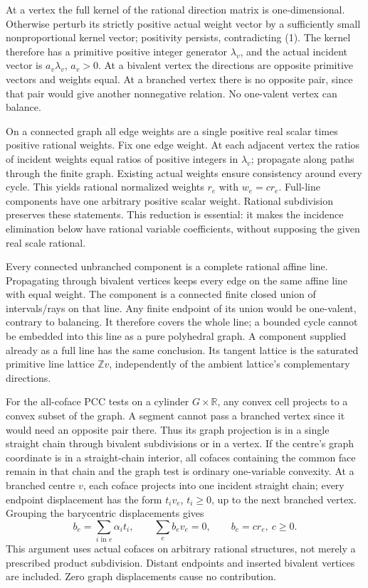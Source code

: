 \documentclass[
  11pt,
]{article}
\begin{document}
At a vertex the full kernel of the rational direction matrix is
one-dimensional. Otherwise perturb its strictly positive actual weight
vector by a sufficiently small nonproportional kernel vector; positivity
persists, contradicting (1). The kernel therefore has a primitive
positive integer generator \(\lambda_v\), and the actual incident vector
is \(a_v\lambda_v\), \(a_v>0\). At a bivalent vertex the directions are
opposite primitive vectors and weights equal. At a branched vertex there
is no opposite pair, since that pair would give another nonnegative
relation. No one-valent vertex can balance.

On a connected graph all edge weights are a single positive real scalar
times positive rational weights. Fix one edge weight. At each adjacent
vertex the ratios of incident weights equal ratios of positive integers
in \(\lambda_v\); propagate along paths through the finite graph.
Existing actual weights ensure consistency around every cycle. This
yields rational normalized weights \(r_e\) with \(w_e=c r_e\). Full-line
components have one arbitrary positive scalar weight. Rational
subdivision preserves these statements. This reduction is essential: it
makes the incidence elimination below have rational variable
coefficients, without supposing the given real scale rational.

Every connected unbranched component is a complete rational affine line.
Propagating through bivalent vertices keeps every edge on the same
affine line with equal weight. The component is a connected finite
closed union of intervals/rays on that line. Any finite endpoint of its
union would be one-valent, contrary to balancing. It therefore covers
the whole line; a bounded cycle cannot be embedded into this line as a
pure polyhedral graph. A component supplied already as a full line has
the same conclusion. Its tangent lattice is the saturated primitive line
lattice \(\mathbb{Z}v\), independently of the ambient lattice's
complementary directions.

For the all-coface PCC tests on a cylinder \(G\times\mathbb{R}\), any
convex cell projects to a convex subset of the graph. A segment cannot
pass a branched vertex since it would need an opposite pair there. Thus
its graph projection is in a single straight chain through bivalent
subdivisions or in a vertex. If the centre's graph coordinate is in a
straight-chain interior, all cofaces containing the common face remain
in that chain and the graph test is ordinary one-variable convexity. At
a branched centre \(v\), each coface projects into one incident straight
chain; every endpoint displacement has the form \(t_i v_e\),
\(t_i\geq0\), up to the next branched vertex. Grouping the barycentric
displacements gives \[
 b_e=\sum_{i\text{ in }e}\alpha_i t_i,
 \qquad\sum_e b_ev_e=0,\qquad b_e=c r_e,\ c\geq0.           \tag{9}
\] This argument uses actual cofaces on arbitrary rational structures,
not merely a prescribed product subdivision. Distant endpoints and
inserted bivalent vertices are included. Zero graph displacements cause
no contribution.
\end{document}
